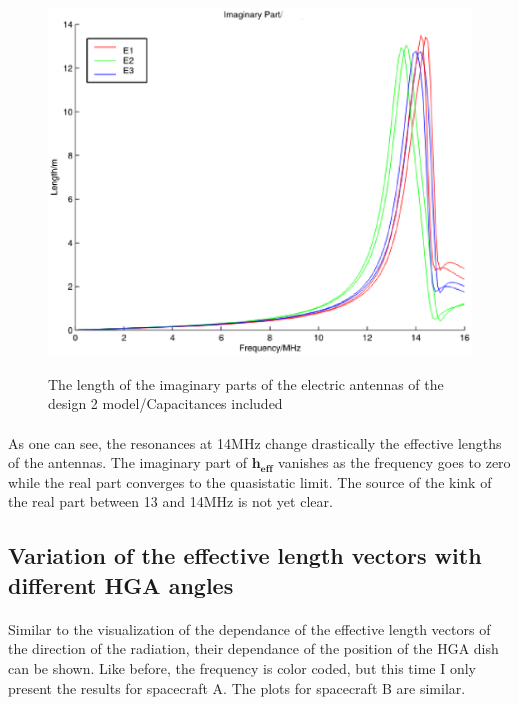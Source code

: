 \documentclass[a4paper,10pt]{thesis}
\begin{document}
\begin{figure}
\begin{center}
\includegraphics[scale=0.45]{HeffLengthImagD2_caps.eps} \\
\caption{The length of the imaginary parts of the electric antennas of the  design 2 model/Capacitances included} \label{fig_Heff_length_imag_caps_D2}
\end{center}
\end{figure}

\paragraph*{}
As one can see, the resonances at 14MHz change drastically the
effective lengths of the antennas. The imaginary part of $\mathbf{h_{eff}}$ vanishes as the
frequency goes to zero while the real part converges to the quasistatic limit. The source of the kink of the real part between 13 and 14MHz is not yet clear.
\\

\subsection{Variation of the effective length vectors with different HGA angles}
\paragraph*{}
Similar to the visualization of the dependance of the effective length vectors of the direction of the radiation, their dependance of the position of the HGA dish can be shown. Like before, the frequency is color coded, but this time I only present the results for spacecraft A. The plots for spacecraft B are similar.
\end{document}
